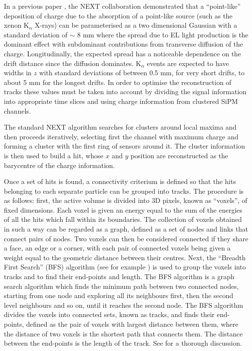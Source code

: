 \documentclass[a4paper,11pt]{article}
\begin{document}
In a previous paper \cite{Lorca:2014sra}, the NEXT collaboration demonstrated that a ``point-like''
deposition of charge due to the absorption of a point-like source (such as the xenon K$_\alpha$ X-rays) can be parameterised as a two dimensional Gaussian with a standard deviation of $\sim$ 8 mm where the spread due to EL light production is the dominant effect with subdominant contributions from transverse diffusion of the charge. Longitudinally, the expected spread has a noticeable dependence on the drift distance since the diffusion dominates. K$_\alpha$ events are expected to have widths in $z$ with standard deviations of between 0.5 mm, for very short drifts, to about 5 mm for the longest drifts. In order to optimise the reconstruction of tracks these values must be taken into account by dividing the signal information into appropriate time slices and using charge information from clustered SiPM channels.

The standard NEXT algorithm searches for clusters around local maxima and then proceeds iteratively, selecting first the channel with maximum charge and forming a cluster with the first ring of sensors around it. The cluster information is then used to build a hit, whose $x$ and $y$ position are reconstructed as the barycentre of the charge information. 

Once a set of hits is found, a connectivity criterium is  defined so that the hits belonging to each separate particle can be grouped into tracks. The procedure is as follows: first, the active volume is divided into 3D pixels, known as ``voxels'', of fixed dimensions. Each voxel is given an energy equal to the sum of the energies of all the hits which fall within its boundaries. The collection of voxels obtained in such a way can be regarded as a graph, defined as a set of nodes and links that connect pairs of nodes. Two voxels can then be considered connected if they share a face, an edge or a corner, with each pair of connected voxels being given a weight equal to the geometric distance between their centres. Next, the ``Breadth First Search'' (BFS) algorithm (see for example \cite{Cormen_2001}) is used to group the voxels into tracks and to find their end-points and length. The BFS algorithm is a graph search algorithm which finds the minimum path between two connected nodes, starting from one node and exploring all its neighbours first, then the second level neighbours and so on, until it reaches the second node. The BFS algorithm divides the voxels into connected sets, known as tracks, and finds their end-points, defined as the pair of voxels with largest distance between them, where the distance of two voxels is the shortest path that connects them. The distance between the end-points is the length of the track. See \cite{NEXT_topology} for a thorough discussion.
\end{document}
